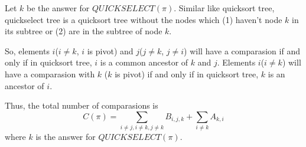 Let $k$ be the answer for $QUICKSELECT(\pi)$. Similar like quicksort tree, quickselect tree is a quicksort tree without the nodes which (1) haven't node $k$ in its subtree or (2) are in the subtree of node $k$.\par
So, elements $i$($i\neq k$, $i$ is pivot) and $j$($j\neq k$, $j\neq i$) will have a comparasion if and only if in quicksort tree, $i$ is a common ancestor of $k$ and $j$. Elements $i$($i\neq k$) will have a comparasion with $k$ ($k$ is pivot) if and only if in quicksort tree, $k$ is an ancestor of $i$.\par
Thus, the total number of comparasions is $$C(\pi) = \sum_{i\neq j, i\neq k, j\neq k}B_{i,j,k}+\sum_{i\neq k}A_{k,i}$$ where $k$ is the answer for $QUICKSELECT(\pi)$.
